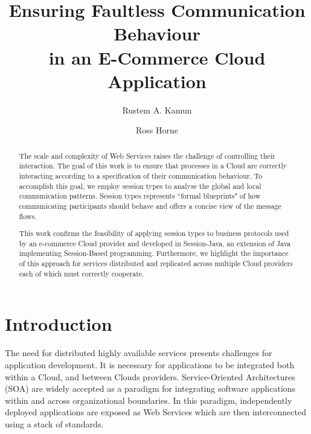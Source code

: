 \documentclass[10pt]{llncs}
\title{Ensuring Faultless Communication Behaviour\\
       in an E-Commerce Cloud Application}
\author{
	Rustem A. Kamun \and Ross Horne
}
\institute{
  Kazakh-British Technical University, 
  Faculty of Information Technology,\\
  Almaty, Kazakhstan\\
  \email{r.kamun@gmail.com}
}
\begin{document}
\maketitle

\begin{abstract}
The scale and complexity of Web Services raises the challenge of controlling their interaction. The goal of this work is to ensure that processes in a Cloud are correctly interacting according to a specification of their communication behaviour. To accomplish this goal, we employ session types to analyse the global and local communication patterns. Session types represents ``formal blueprints" of how communicating participants should behave and offers a concise view of the message flows.
  
This work confirms the feasibility of applying session types to business protocols used by an e-commerce Cloud provider and developed in Session-Java, an extension of Java implementing Session-Based programming. Furthermore, we highlight the importance of this approach for services distributed and replicated across multiple Cloud providers each of which must correctly cooperate.
\end{abstract}

\setcounter{tocdepth}{2}

\pagestyle{empty}


\section{Introduction}
\label{sect:introduction}

The need for distributed highly available services presents challenges for application development.
It is necessary for applications to be integrated both within a Cloud, and between Clouds providers. %
Service-Oriented Architectures (SOA) are widely accepted as a paradigm for integrating software applications within and across organizational boundaries.
In this paradigm, independently deployed applications are exposed as Web Services which are then 
interconnected using a stack of standards. %
		
\end{document}
